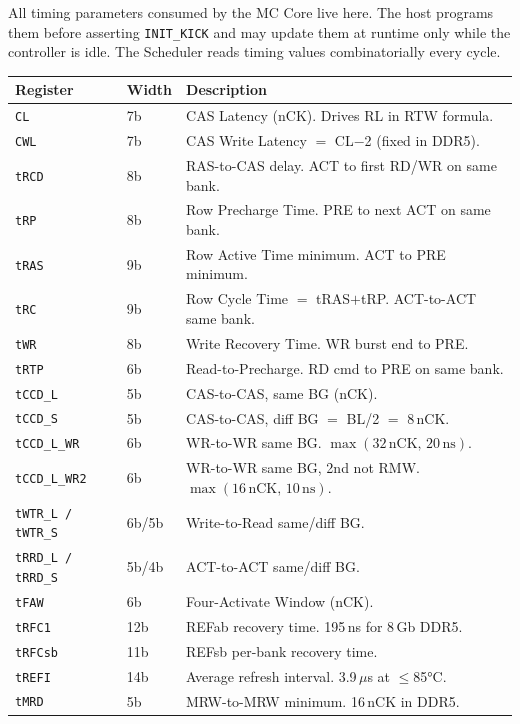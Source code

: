 \documentclass[10pt,a4paper]{article}
\newcommand{\Th}[1]{\cellcolor{cellbg}\textbf{\small #1}}
\newcommand{\RA}{\rowcolor{white}}
\newcommand{\RB}{\rowcolor{altbg}}
\begin{document}
All timing parameters consumed by the MC Core live here. The host programs them before
asserting \texttt{INIT\_KICK} and may update them at runtime only while the controller is
idle. The Scheduler reads timing values combinatorially every cycle.

\begin{center}
\begin{tabularx}{\linewidth}{@{} l l X @{}}
\toprule
\Th{Register} & \Th{Width} & \Th{Description} \\
\midrule
\RA \texttt{CL} & 7b & CAS Latency (nCK). Drives RL in RTW formula. \\
\RB \texttt{CWL} & 7b & CAS Write Latency $=$ CL$-$2 (fixed in DDR5). \\
\RA \texttt{tRCD} & 8b & RAS-to-CAS delay. ACT to first RD/WR on same bank. \\
\RB \texttt{tRP} & 8b & Row Precharge Time. PRE to next ACT on same bank. \\
\RA \texttt{tRAS} & 9b & Row Active Time minimum. ACT to PRE minimum. \\
\RB \texttt{tRC} & 9b & Row Cycle Time $=$ tRAS$+$tRP. ACT-to-ACT same bank. \\
\RA \texttt{tWR} & 8b & Write Recovery Time. WR burst end to PRE. \\
\RB \texttt{tRTP} & 6b & Read-to-Precharge. RD cmd to PRE on same bank. \\
\RA \texttt{tCCD\_L} & 5b & CAS-to-CAS, same BG (nCK). \\
\RB \texttt{tCCD\_S} & 5b & CAS-to-CAS, diff BG $=$ BL/2 $=$ 8\,nCK. \\
\RA \texttt{tCCD\_L\_WR} & 6b & WR-to-WR same BG. $\max(32\,\text{nCK},\,20\,\text{ns})$. \\
\RB \texttt{tCCD\_L\_WR2} & 6b & WR-to-WR same BG, 2nd not RMW. $\max(16\,\text{nCK},\,10\,\text{ns})$. \\
\RA \texttt{tWTR\_L / tWTR\_S} & 6b/5b & Write-to-Read same/diff BG. \\
\RB \texttt{tRRD\_L / tRRD\_S} & 5b/4b & ACT-to-ACT same/diff BG. \\
\RA \texttt{tFAW} & 6b & Four-Activate Window (nCK). \\
\RB \texttt{tRFC1} & 12b & REFab recovery time. 195\,ns for 8\,Gb DDR5. \\
\RA \texttt{tRFCsb} & 11b & REFsb per-bank recovery time. \\
\RB \texttt{tREFI} & 14b & Average refresh interval. 3.9\,$\mu$s at $\leq$85°C. \\
\RA \texttt{tMRD} & 5b & MRW-to-MRW minimum. 16\,nCK in DDR5. \\

\end{tabularx}
\end{center}
\end{document}
